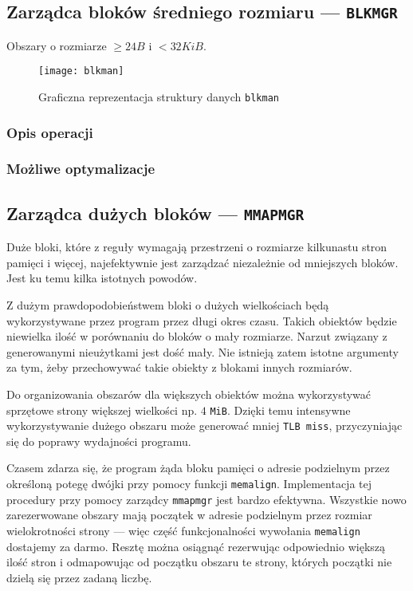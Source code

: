 \documentclass[12pt,a4paper,titlepage,twoside]{mwart}
\begin{document}
\newpage

\subsection{Zarządca bloków średniego rozmiaru --- \texttt{BLKMGR}}

Obszary o rozmiarze $\ge 24B$ i $< 32KiB$.

\begin{figure}[h]
\centering
\texttt{[image: blkman]}
\caption{Graficzna reprezentacja struktury danych \texttt{blkman}}
\end{figure}

\subsubsection{Opis operacji}

\subsubsection{Możliwe optymalizacje}

\newpage


\subsection{Zarządca dużych bloków --- \texttt{MMAPMGR}}

Duże bloki, które z reguły wymagają przestrzeni o rozmiarze kilkunastu stron
pamięci i więcej, najefektywnie jest zarządzać niezależnie od mniejszych
bloków. Jest ku temu kilka istotnych powodów.

Z dużym prawdopodobieństwem bloki o dużych wielkościach będą wykorzystywane
przez program przez długi okres czasu. Takich obiektów będzie niewielka ilość w
porównaniu do bloków o mały rozmiarze. Narzut związany z generowanymi
nieużytkami jest dość mały. Nie istnieją zatem istotne argumenty za tym, żeby
przechowywać takie obiekty z blokami innych rozmiarów.

Do organizowania obszarów dla większych obiektów można wykorzystywać sprzętowe
strony większej wielkości np. $4$ \verb+MiB+. Dzięki temu intensywne
wykorzystywanie dużego obszaru może generować mniej \texttt{TLB miss},
przyczyniając się do poprawy wydajności programu.

Czasem zdarza się, że program żąda bloku pamięci o adresie podzielnym przez
określoną potegę dwójki przy pomocy funkcji \verb+memalign+. Implementacja tej
procedury przy pomocy zarządcy \texttt{mmapmgr} jest bardzo efektywna.
Wszystkie nowo zarezerwowane obszary mają początek w adresie podzielnym przez
rozmiar wielokrotności strony --- więc część funkcjonalności wywołania
\verb+memalign+ dostajemy za darmo. Resztę można osiągnąć rezerwując
odpowiednio większą ilość stron i odmapowując od początku obszaru te strony,
których początki nie dzielą się przez zadaną liczbę.
\end{document}
